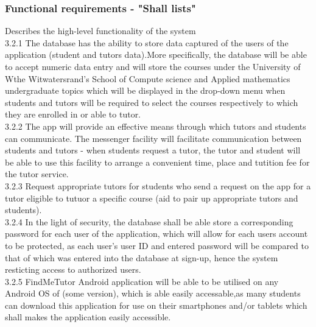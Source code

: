 \documentclass[12pt]{article}
\begin{document}
\subsubsection{Functional requirements - "Shall lists"}
Describes the high-level functionality of the system\\
3.2.1 The database has the ability to store data captured of the users of the application (student and tutors data).More specifically, the database will be able to accept numeric data entry and will store the courses under the University of Wthe Witwatersrand's School of Compute science and Applied mathematics undergraduate topics which will be displayed in the drop-down menu when students and tutors will be required to select the courses respectively to which they are enrolled in or able to tutor. \\
3.2.2 The app will provide an effective means through which tutors and students can communicate. The messenger facility will facilitate communication between students and tutors - when students request a tutor, the tutor and student will be able to use this facility to arrange a convenient time, place and tutition fee for the tutor service. \\
3.2.3 Request appropriate tutors for students who send a request on the app for a tutor eligible to tutuor a specific course (aid to pair up appropriate tutors and students).\\
3.2.4 In the light of security, the database shall be able store a corresponding password for each user of the application, which will allow for each users account to be protected, as each user's user ID and entered password will be compared to that of which was entered into the database at sign-up, hence the system resticting access to authorized users. \\
3.2.5 FindMeTutor Android application will be able to be utilised on any Android OS of (some version), which is able easily accessable,as many students can download this application for use on their smartphones and/or tablets which shall makes the application easily accessible. 
\end{document}
